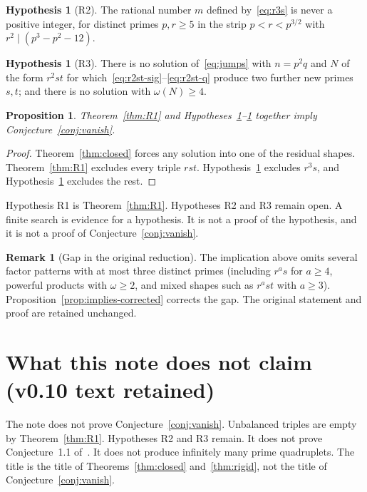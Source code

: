 \documentclass[11pt,reqno]{amsart}
\newtheorem{proposition}[theorem]{Proposition}
\theoremstyle{definition}
\newtheorem{hypothesis}[theorem]{Hypothesis}
\newtheorem{remark}[theorem]{Remark}
\begin{document}
\begin{hypothesis}[R2]
\label{hyp:R2}
The rational number \(m\) defined by~\eqref{eq:r3s} is never a positive integer, for distinct primes \(p,r\ge 5\) in the strip \(p<r<p^{3/2}\) with \(r^2\mid(p^3-p^2-12)\).
\end{hypothesis}

\begin{hypothesis}[R3]
\label{hyp:R3}
There is no solution of~\eqref{eq:jumps} with \(n=p^2q\) and \(N\) of the form \(r^2st\) for which~\eqref{eq:r2st-sig}--\eqref{eq:r2st-q} produce two further new primes \(s,t\); and there is no solution with \(\omega(N)\ge 4\).
\end{hypothesis}

\begin{proposition}
\label{prop:implies}
Theorem~\ref{thm:R1} and Hypotheses~\ref{hyp:R2}--\ref{hyp:R3} together imply Conjecture~\ref{conj:vanish}.
\end{proposition}

\begin{proof}
Theorem~\ref{thm:closed} forces any solution into one of the residual shapes. Theorem~\ref{thm:R1} excludes every triple \(rst\). Hypothesis~\ref{hyp:R2} excludes \(r^3s\), and Hypothesis~\ref{hyp:R3} excludes the rest.
\end{proof}

Hypothesis R1 is Theorem~\ref{thm:R1}. Hypotheses R2 and R3 remain open. A finite search is evidence for a hypothesis. It is not a proof of the hypothesis, and it is not a proof of Conjecture~\ref{conj:vanish}.

\begin{remark}[Gap in the original reduction]
\label{rem:prop32-gap}
The implication above omits several factor patterns with at most three distinct primes (including \(r^as\) for \(a\ge 4\), powerful products with \(\omega\ge 2\), and mixed shapes such as \(r^ast\) with \(a\ge 3\)). Proposition~\ref{prop:implies-corrected} corrects the gap. The original statement and proof are retained unchanged.
\end{remark}

\section*{What this note does not claim (v0.10 text retained)}

The note does not prove Conjecture~\ref{conj:vanish}. Unbalanced triples are empty by Theorem~\ref{thm:R1}. Hypotheses R2 and R3 remain. It does not prove Conjecture~1.1 of~\cite{RCW2026}. It does not produce infinitely many prime quadruplets. The title is the title of Theorems~\ref{thm:closed} and~\ref{thm:rigid}, not the title of Conjecture~\ref{conj:vanish}.
\end{document}
